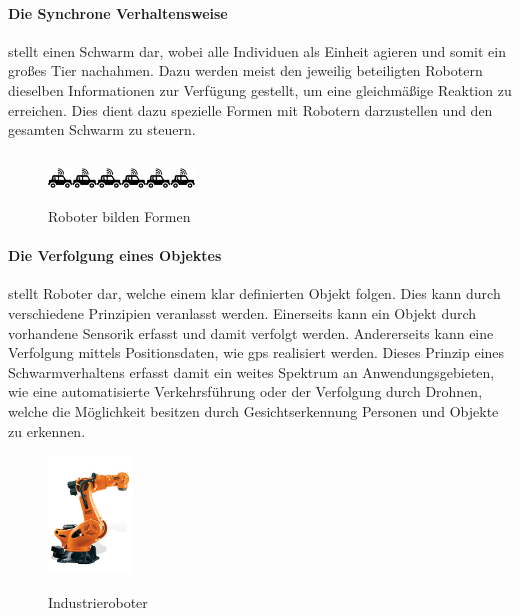 \paragraph{Die Synchrone Verhaltensweise} stellt einen Schwarm dar, wobei alle Individuen als Einheit agieren und somit ein großes Tier nachahmen. Dazu werden meist den jeweilig beteiligten Robotern dieselben Informationen zur Verfügung gestellt, um eine gleichmäßige Reaktion zu erreichen. Dies dient dazu spezielle Formen mit Robotern darzustellen und den gesamten Schwarm zu steuern.

\begin{verbatim}
\end{verbatim}
\newpage

\begin{figure}
	\begin{center}
		\includegraphics[width=0.35\textwidth]{images/technische_grundlagen/verkehr.png}
	\end{center}
	\caption{Roboter bilden Formen}
	\cite{ETHZuerich.InduzierterVerkehr}
	\label{fig:verkehr}
\end{figure}
\paragraph{Die Verfolgung eines Objektes} stellt Roboter dar, welche einem klar definierten Objekt folgen. Dies kann durch verschiedene Prinzipien veranlasst werden. Einerseits kann ein Objekt durch vorhandene Sensorik erfasst und damit verfolgt werden. Andererseits kann eine Verfolgung mittels Positionsdaten, wie \gls{gps} realisiert werden. Dieses Prinzip eines Schwarmverhaltens erfasst damit ein weites Spektrum an Anwendungsgebieten, wie eine automatisierte Verkehrsführung oder der Verfolgung durch Drohnen, welche die Möglichkeit besitzen durch Gesichtserkennung Personen und Objekte zu erkennen.

\begin{figure}
	\begin{center}
		\includegraphics[width=0.2\textwidth]{images/technische_grundlagen/industrie.jpg}
	\end{center}
	\caption{Industrieroboter}
	\cite{KUKA.IndustrieroboterKUKA}
	\label{fig:industrie}
\end{figure}
